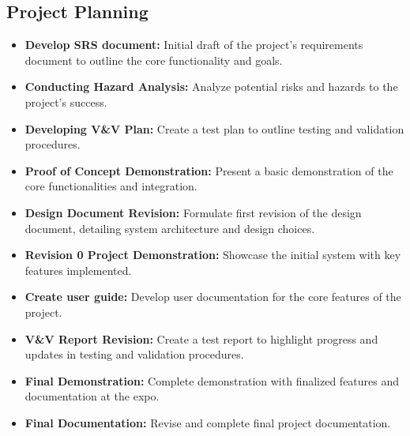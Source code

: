 \documentclass[12pt]{article}
\begin{document}
\subsection{Project Planning}
\begin{itemize}
  \item \textbf{Develop SRS document:}  Initial draft of the project's requirements document to outline the core functionality and goals.
  \item \textbf{Conducting Hazard Analysis:} Analyze potential risks and hazards to the project’s success.

  \item \textbf{Developing V\&V Plan:} Create a test plan to outline testing and validation procedures.
  \item \textbf{Proof of Concept Demonstration:} Present a basic demonstration of the core functionalities and integration.
  \item \textbf{Design Document Revision:} Formulate first revision of the design document, detailing system architecture and design choices.
  \item \textbf{Revision 0 Project Demonstration:}  Showcase the initial system with key features implemented.
  \item \textbf{Create user guide:} Develop user documentation for the core features of the project.
  \item \textbf{V\&V Report Revision:} Create a test report to highlight progress and updates in testing and validation procedures.
  \item \textbf{Final Demonstration:} Complete demonstration with finalized features and documentation at the expo.
  \item \textbf{Final Documentation:} Revise and complete final project documentation.
\end{itemize}
\end{document}
